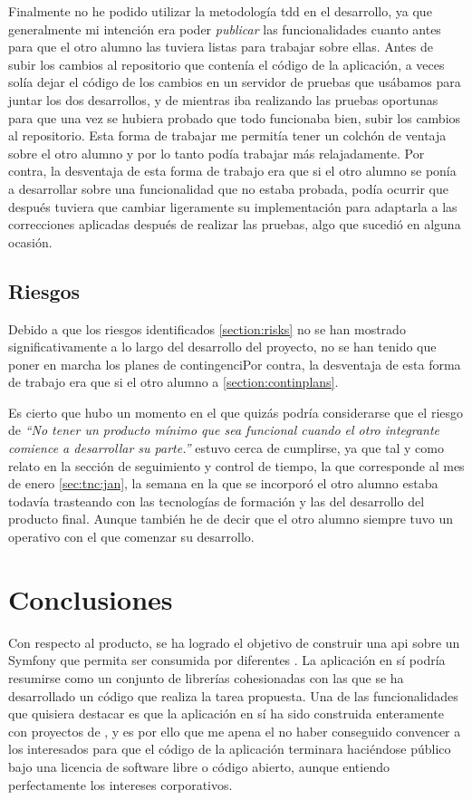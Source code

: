 Finalmente no he podido utilizar la metodología \gls{tdd} en el desarrollo, ya que
generalmente mi intención era poder \textit{publicar} las funcionalidades cuanto
antes para que el otro alumno las tuviera listas para trabajar sobre ellas. Antes de
subir los cambios al repositorio que contenía el código de la aplicación, a veces solía
dejar el código de los cambios en un servidor de pruebas que usábamos para juntar los
dos desarrollos, y de mientras iba realizando las pruebas oportunas para que una vez
se hubiera probado que todo funcionaba bien, subir los cambios al repositorio. Esta
forma de trabajar me permitía tener un colchón de ventaja sobre el otro alumno y por lo
tanto podía trabajar más relajadamente. Por contra, la desventaja
de esta forma de trabajo era que si el otro alumno se ponía a desarrollar sobre una
funcionalidad que no estaba probada, podía ocurrir que después tuviera que cambiar
ligeramente su implementación para adaptarla a las correcciones aplicadas después
de realizar las pruebas, algo que sucedió en alguna ocasión.

\subsection{Riesgos}
Debido a que los riesgos identificados \ref{section:risks} no se han mostrado
significativamente a lo largo del desarrollo del proyecto, no se han tenido que
poner en marcha los planes de contingenciPor contra, la desventaja
de esta forma de trabajo era que si el otro alumno a \ref{section:continplans}.

Es cierto que hubo un momento en el que quizás podría considerarse que el riesgo
de 
\textit{``No tener un producto mínimo que sea funcional cuando el otro
integrante comience a desarrollar su parte.''} estuvo cerca de cumplirse, ya
que tal y como relato en la sección de seguimiento y control de tiempo, la
que corresponde al mes de enero \ref{sec:tnc:jan}, la semana en la que se
incorporó el otro alumno estaba todavía trasteando con las tecnologías de
formación y las del desarrollo del producto final. Aunque también he de decir
que el otro alumno siempre tuvo un  operativo con
el que comenzar su desarrollo.

\section{Conclusiones}
Con respecto al producto, se ha logrado el objetivo de construir una \gls{api}
sobre un  Symfony que permita ser consumida por
diferentes . La aplicación en sí podría resumirse
como un conjunto de librerías cohesionadas con las que se ha desarrollado
un código que realiza la tarea propuesta. Una de las funcionalidades que
quisiera destacar es que la aplicación en sí ha sido construida enteramente con
proyectos de , y es por ello que me apena el no haber conseguido
convencer a los interesados para que el código de la aplicación terminara haciéndose
público bajo una licencia de software libre o código abierto, aunque entiendo perfectamente
los intereses corporativos.

